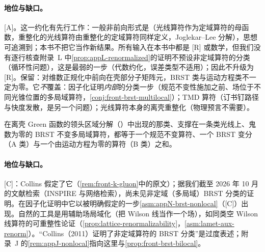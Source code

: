 \paragraph{地位与缺口。}[A]。这一约化有先行工作：一般非前向形式是\cite[式~(2.4)、(2.6)、(3.1)、(3.2)]{Braun:2019qtp}（光线算符作为定域算符的母函数，重整化的光线算符由重整化的定域算符同样定义，Joglekar--Lee 分解），思想可追溯到\cite{Balitsky:1987bk}；本书不把它当作新结果。所有输入在本书中都是 [R] 或数学，但我们没有逐行核查附录~L 中\cref{prop:appL-renormalized}的证明不预设非定域算符的分类（循环性问题），这是最弱的一步（代数约化，误差类型不适用）；因此不升级为 [R]。保留：对维数正规化中前向在壳部分子矩阵元，BRST 类与运动方程类不一定为零。它\emph{不}覆盖：因子化证明\emph{内部}的分类一步（规范不变性施加之前、场位于不同光锥位置的多局域算符，\cref{conj:front-brst-multilocal}）；TMD 算符（订书钉路径与快度发散，是另一个问题）；光线算符本身的离壳重整化（物理预言不需要）。

\begin{conjecture}\label{conj:front-brst-multilocal}
在离壳 Green 函数的领头区域分解（\cite[式~(11.12)]{Collins2011}）中出现的那类、支撑在一条类光线上、鬼数为零的 BRST 不变多局域算符，都等于一个规范不变算符、一个 BRST 变分（A 类）与一个由运动方程为零的算符（B 类）之和。
\end{conjecture}

\paragraph{地位与缺口。}[C]：Collins 假定了它（\cref{rem:front-k-gluon}中的原文）；据我们截至 2026 年 10 月的文献检索（INSPIRE 与网络检索），尚未见非定域（多局域）BRST 分类的证明。在因子化证明中它以被明确假定的一步\cref{asm:appN-brst-nonlocal}（[C]）出现。自然的工具是用辅助场局域化（把 Wilson 线当作一个场），如同类空 Wilson 线算符的可重整性论证\cite{Ji:2017oey,Ishikawa:2017faj,Green:2017xeu}（\cref{prop:lattice-renormalizability}，\cref{asm:lamet-aux-renorm}）。“Collins（2011）证明了非定域算符的 BRST 分类”是过度表述；附录~J 的\cref{rem:appJ-nonlocal}指向这里与\cref{prop:front-brst-bilocal}。
